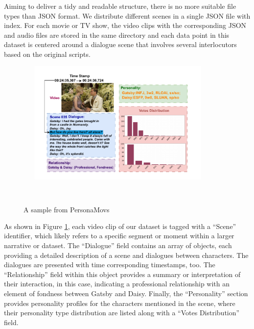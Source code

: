 Aiming to deliver a tidy and readable structure, there is no more suitable file types than JSON format. We distribute different scenes in a single JSON file with index. For each movie or TV show, the video clips with the corresponding JSON and audio files are stored in the same directory and each data point in this dataset is centered around a dialogue scene that involves several interlocutors based on the original scripts. 
\begin{figure}[th!]
  \centering
  \includegraphics[width=0.8\textwidth, trim=0 15 0 0, clip]{images/Sample.pdf}
  \caption{A sample from PersonaMovs}
  \label{fig:sample}
\end{figure}

As shown in Figure \ref{fig:sample}, each video clip of our dataset is tagged with a ``Scene'' identifier, which likely refers to a specific segment or moment within a larger narrative or dataset. The ``Dialogue'' field contains an array of objects, each providing a detailed description of a scene and dialogues between characters. The dialogues are presented with time corresponding timestamps, too. The ``Relationship'' field within this object provides a summary or interpretation of their interaction, in this case, indicating a professional relationship with an element of fondness between Gatsby and Daisy. Finally, the ``Personality'' section provides personality profiles for the characters mentioned in the scene, where their personality type distribution are listed along with a ``Votes Distribution'' field.

